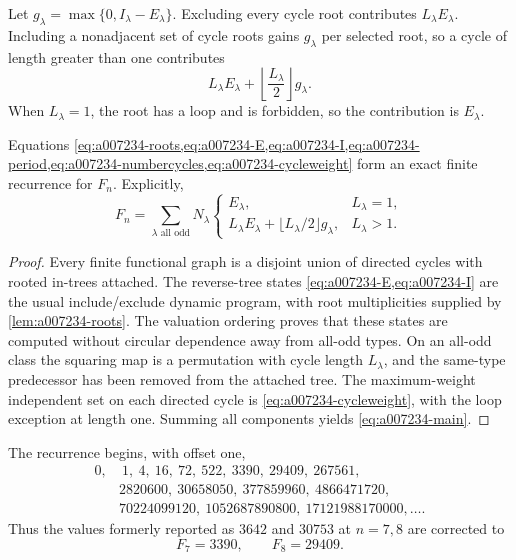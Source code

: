 Let \(g_\lambda=\max\{0,I_\lambda-E_\lambda\}\).  Excluding every cycle root
contributes \(L_\lambda E_\lambda\).  Including a nonadjacent set of cycle
roots gains \(g_\lambda\) per selected root, so a cycle of length greater than
one contributes
\begin{equation}
 L_\lambda E_\lambda+
 \left\lfloor\frac{L_\lambda}{2}\right\rfloor g_\lambda.
 \label{eq:a007234-cycleweight}
\end{equation}
When \(L_\lambda=1\), the root has a loop and is forbidden, so the contribution
is \(E_\lambda\).

\begin{theorem}
\label{thm:a007234}
Equations
\cref{eq:a007234-roots,eq:a007234-E,eq:a007234-I,eq:a007234-period,eq:a007234-numbercycles,eq:a007234-cycleweight}
form an exact finite recurrence for \(F_n\).  Explicitly,
\begin{equation}
 F_n=\sum_{\lambda\text{ all odd}}N_\lambda
 \begin{cases}
 E_\lambda,&L_\lambda=1,\\[2mm]
 L_\lambda E_\lambda+
 \lfloor L_\lambda/2\rfloor g_\lambda,&L_\lambda>1.
 \end{cases}
 \label{eq:a007234-main}
\end{equation}
\end{theorem}

\begin{proof}
Every finite functional graph is a disjoint union of directed cycles with
rooted in-trees attached.  The reverse-tree states
\cref{eq:a007234-E,eq:a007234-I} are the usual include/exclude dynamic
program, with root multiplicities supplied by
\cref{lem:a007234-roots}.  The valuation ordering proves that these states are
computed without circular dependence away from all-odd types.  On an all-odd
class the squaring map is a permutation with cycle length
\(L_\lambda\), and the same-type predecessor has been removed from the
attached tree.  The maximum-weight independent set on each directed cycle is
\cref{eq:a007234-cycleweight}, with the loop exception at length one.
Summing all components yields \cref{eq:a007234-main}.
\end{proof}

The recurrence begins, with offset one,
\[
\begin{aligned}
0,&\ 1,\ 4,\ 16,\ 72,\ 522,\ 3390,\ 29409,\ 267561,\\
&2820600,\ 30658050,\ 377859960,\ 4866471720,\\
&70224099120,\ 1052687890800,\ 17121988170000,\ldots.
\end{aligned}
\]
Thus the values formerly reported as \(3642\) and \(30753\) at \(n=7,8\) are
corrected to
\begin{equation}
 \boxed{F_7=3390,\qquad F_8=29409.}
 \label{eq:a007234-corrections}
\end{equation}

